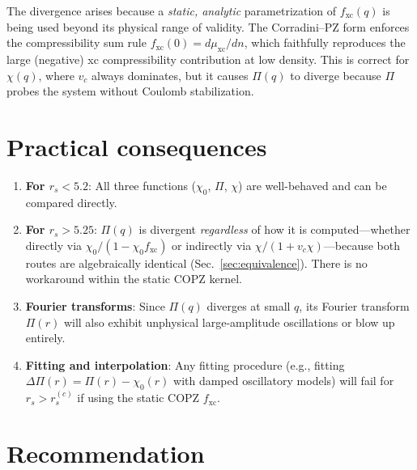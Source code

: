 \documentclass[aps,prb,twocolumn,superscriptaddress,floatfix]{revtex4-2}
\begin{document}
The divergence arises because a \emph{static, analytic} parametrization
of $f_{\mathrm{xc}}(q)$ is being used beyond its physical range of validity.
The Corradini--PZ form enforces the compressibility sum rule
$f_{\mathrm{xc}}(0) = d\mu_{\mathrm{xc}}/dn$, which faithfully reproduces
the large (negative) xc compressibility contribution at low density.
This is correct for $\chi(q)$, where $v_c$ always dominates, but it
causes $\Pi(q)$ to diverge because $\Pi$ probes the system without
Coulomb stabilization.

\section{Practical consequences}
\label{sec:consequences}

\begin{enumerate}
    \item \textbf{For $r_s < 5.2$}: All three functions ($\chi_0$, $\Pi$, $\chi$)
          are well-behaved and can be compared directly.

    \item \textbf{For $r_s > 5.25$}: $\Pi(q)$ is divergent \emph{regardless} of
          how it is computed---whether directly via $\chi_0/(1-\chi_0 f_{\mathrm{xc}})$
          or indirectly via $\chi/(1+v_c \chi)$---because both routes are
          algebraically identical (Sec.~\ref{sec:equivalence}).  There is no
          workaround within the static COPZ kernel.

    \item \textbf{Fourier transforms}: Since $\Pi(q)$ diverges at small $q$,
          its Fourier transform $\Pi(r)$ will also exhibit unphysical large-amplitude
          oscillations or blow up entirely.

    \item \textbf{Fitting and interpolation}: Any fitting procedure
          (e.g., fitting $\Delta\Pi(r) = \Pi(r) - \chi_0(r)$ with damped
          oscillatory models) will fail for $r_s > r_s^{(c)}$ if using the
          static COPZ $f_{\mathrm{xc}}$.
\end{enumerate}

\section{Recommendation}
\label{sec:recommendation}
\end{document}
